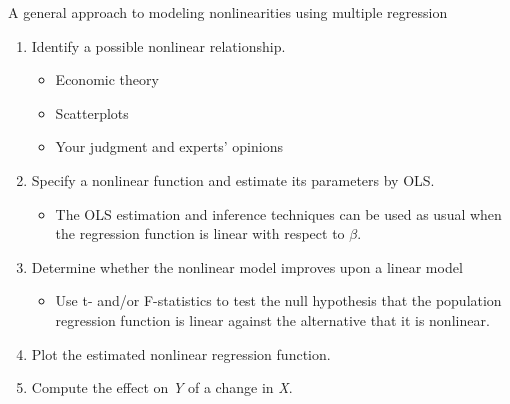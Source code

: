 \documentclass[presentation,10pt]{beamer}
\begin{document}
\begin{frame}[label={sec:orgcd43514}]{A general approach to modeling nonlinearities using multiple regression}
\begin{enumerate}
\item Identify a possible nonlinear relationship.
\begin{itemize}
\item Economic theory
\item Scatterplots
\item Your judgment and experts' opinions
\end{itemize}
\item Specify a nonlinear function and estimate its parameters by OLS.
\begin{itemize}
\item The OLS estimation and inference techniques can be used as usual
when the regression function is linear with respect to \(\beta\).
\end{itemize}
\item Determine whether the nonlinear model improves upon a linear model
\begin{itemize}
\item Use t- and/or F-statistics to test the null hypothesis that the
population regression function is linear against the alternative
that it is nonlinear.
\end{itemize}
\item Plot the estimated nonlinear regression function.
\item Compute the effect on \emph{Y} of a change in \emph{X}.
\end{enumerate}
\end{frame}
\end{document}
